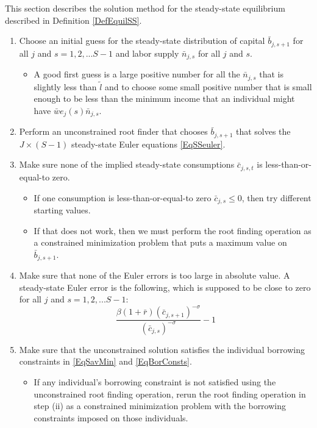 \documentclass[letterpaper,12pt]{article}
\theoremstyle{definition}
\begin{document}
  This section describes the solution method for the steady-state equilibrium described in Definition \ref{DefEquilSS}.

  \begin{enumerate}
    \item Choose an initial guess for the steady-state distribution of capital $\bar{b}_{j,s+1}$ for all $j$ and $s=1,2,...S-1$ and labor supply $\bar{n}_{j,s}$ for all $j$ and $s$.
      \begin{itemize}
        \item A good first guess is a large positive number for all the $\bar{n}_{j,s}$ that is slightly less than $\tilde{l}$ and to choose some small positive number that is small enough to be less than the minimum income that an individual might have $\bar{w}e_j(s)\bar{n}_{j,s}$.
      \end{itemize}
    \item Perform an unconstrained root finder that chooses $\bar{b}_{j,s+1}$ that solves the $J\times(S-1)$ steady-state Euler equations \eqref{EqSSeuler}.
    \item Make sure none of the implied steady-state consumptions $\bar{c}_{j,s,t}$ is less-than-or-equal-to zero.
      \begin{itemize}
        \item If one consumption is less-than-or-equal-to zero $\bar{c}_{j,s}\leq 0$, then try different starting values.
        \item If that does not work, then we must perform the root finding operation as a constrained minimization problem that puts a maximum value on $\bar{b}_{j,s+1}$.
      \end{itemize}
    \item Make sure that none of the Euler errors is too large in absolute value. A steady-state Euler error is the following, which is supposed to be close to zero for all $j$ and $s=1,2,...S-1$:
      \begin{equation}\label{EqSSeulerr}
        \frac{\beta \left(1+\bar{r}\right)\left(\bar{c}_{j,s+1}\right)^{-\sigma}}{\left(\bar{c}_{j,s}\right)^{-\sigma}} - 1
      \end{equation}
    \item Make sure that the unconstrained solution satisfies the individual borrowing constraints in \eqref{EqSavMin} and \eqref{EqBorConsts}.
      \begin{itemize}
        \item If any individual's borrowing constraint is not satisfied using the unconstrained root finding operation, rerun the root finding operation in step (ii) as a constrained minimization problem with the borrowing constraints imposed on those individuals.

\end{itemize}
\end{enumerate}
\end{document}
